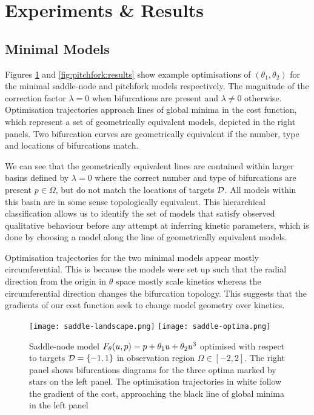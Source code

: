 \section{Experiments \& Results}

\subsection{Minimal Models}
Figures \ref{fig:saddle-node:results} and \ref{fig:pitchfork:results} show example optimisations of $(\theta_1,\theta_2)$ for the minimal saddle-node and pitchfork models respectively. The magnitude of the correction factor $\lambda=0$ when bifurcations are present and $\lambda\neq0$ otherwise. Optimisation trajectories approach lines of global minima in the cost function, which represent a set of geometrically equivalent models, depicted in the right panels. Two bifurcation curves are geometrically equivalent if the number, type and locations of bifurcations match.

We can see that the geometrically equivalent lines are contained within larger basins defined by $\lambda=0$ where the correct number and type of bifurcations are present $p\in\Omega$, but do not match the locations of targets $\mathcal{D}$. All models within this basin are in some sense topologically equivalent. This hierarchical classification allows us to identify the set of models that satisfy observed qualitative behaviour \cite{Stumpf2019ParameterBifurcations} before any attempt at inferring kinetic parameters, which is done by choosing a model along the line of geometrically equivalent models.

Optimisation trajectories for the two minimal models appear mostly circumferential. This is because the models were set up such that the radial direction from the origin in $\theta$ space mostly scale kinetics whereas the circumferential direction changes the bifurcation topology. This suggests that the gradients of our cost function seek to change model geometry over kinetics.

\begin{figure}
\centering
\texttt{[image: saddle-landscape.png]}
\texttt{[image: saddle-optima.png]}
\caption{Saddle-node model $F_{\theta}(u,p) = p + \theta_{1}u+\theta_{2}u^3$ optimised with respect to targets $\mathcal{D}=\{-1,1\}$ in observation region $\Omega\in[-2,2]$. The right panel shows bifurcations diagrams for the three optima marked by stars on the left panel. The optimisation trajectories in white follow the gradient of the cost, approaching the black line of global minima in the left panel}
\label{fig:saddle-node:results}
\end{figure}

